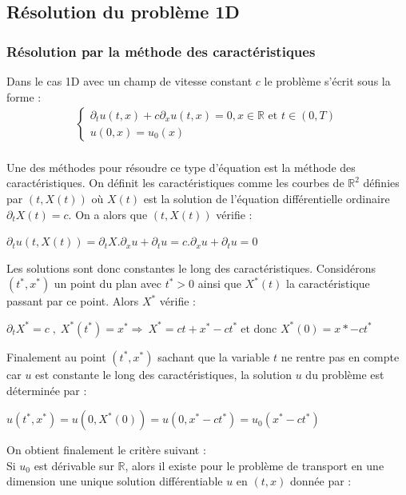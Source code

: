 \documentclass[12pt]{article}
\begin{document}
\subsection{Résolution du problème 1D}
\subsubsection{Résolution par la méthode des caractéristiques}
Dans le cas 1D avec un champ de vitesse constant $c$ le problème s'écrit sous la forme :
\begin{eqnarray*}
    \left\{ 
    \begin{array}{llll}
        \partial_tu(t,x) + c\partial_xu(t,x)=0, x \in \mathbb{R} \text{ et } t \in (0,T)
        \\u(0,x)=u_0(x)
        \end{array}
    \right .
\end{eqnarray*}
\\
Une des méthodes pour résoudre ce type d'équation est la méthode des caractéristiques. On définit les caractéristiques comme les courbes de $\mathbb{R}^2$ définies par $(t,X(t))$ où $X(t)$ est la solution de l'équation différentielle ordinaire $\partial_tX(t)=c$.
On a alors que $(t,X(t))$ vérifie :
\\
\begin{center}
        $\partial_tu(t,X(t))=\partial_tX.\partial_xu+\partial_tu
        =c.\partial_xu+\partial_tu =0$
\end{center}
Les solutions sont donc constantes le long des caractéristiques. 
Considérons $(t^*,x^*)$ un point du plan avec $t^*>0$ ainsi que $X^*(t)$ la caractéristique passant par ce point. Alors $X^*$ vérifie :

\begin{center}
        $\partial_tX^*=c \;,\;  X^*(t^*)=x^*
        \Rightarrow\ X^*=ct+x^*-ct^*\; \text{et donc } X^*(0)=x*-ct^*$
\end{center}

\noindent Finalement au point $(t^*,x^*)$ sachant que la variable $t$ ne rentre pas en compte car $u$ est constante le long des caractéristiques, la solution $u$ du problème est déterminée par :

\begin{center}
    $u(t^*,x^*)=u(0,X^*(0))=u(0,x^*-ct^*)=u_0(x^*-ct^*)$
\end{center}

\noindent On obtient finalement le critère suivant :
\\ Si $u_0$ est dérivable sur $\mathbb{R}$, alors il existe pour le problème de transport en une dimension une unique solution différentiable $u$ en $(t,x)$  donnée par :
\end{document}
